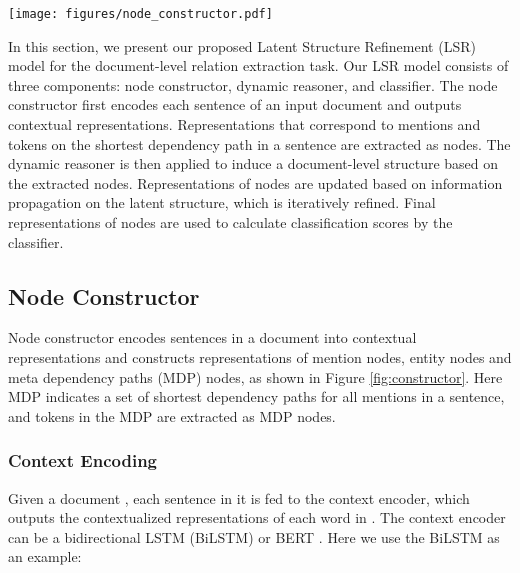 \documentclass[11pt,a4paper]{article}
\begin{document}
\begin{figure*}\centering
\texttt{[image: figures/node\_constructor.pdf]}
\vspace{-3mm}
\caption{Overview of the Node Constructor: A context encoder is applied to get the contextualized representations of sentences. The representations of mentions and words in the meta dependency paths are extracted as mention nodes and MDP nodes. An average pooling is used to construct the entity node from the mention nodes. For example, the entity node \textit{Lutsenko} is constructed by averaging representations of its mentions \textit{Lutsenko} and \textit{He}. All figures best viewed in color.} 
\vspace{-3mm}
\label{fig:constructor}
\end{figure*}

In this section, we present our proposed Latent Structure Refinement (LSR) model for the document-level relation extraction task. Our LSR model consists of three components: node constructor, dynamic reasoner, and classifier. The node constructor first encodes each sentence of an input document and outputs contextual representations. Representations that correspond to mentions and tokens on the shortest dependency path in a sentence are extracted as nodes. The dynamic reasoner is then applied to induce a document-level structure based on the extracted nodes. Representations of nodes are updated based on information propagation on the latent structure, which is iteratively refined. Final representations of nodes are used to calculate classification scores by the classifier.

\subsection{Node Constructor}
\label{ssec:3.1}
Node constructor encodes sentences in a document into contextual representations and constructs representations of mention nodes, entity nodes and meta dependency paths (MDP) nodes, as shown in Figure \ref{fig:constructor}. Here MDP indicates a set of shortest dependency paths for all mentions in a sentence, and tokens in the MDP are extracted as MDP nodes.

\vspace{-1mm}

\subsubsection{Context Encoding}
\label{ssec:3.1.1}
Given a document , each sentence  in it is fed to the context encoder, which outputs the contextualized representations of each word in . The context encoder can be a bidirectional LSTM (BiLSTM) \citep{Schuster1997BidirectionalRN} or BERT \citep{Devlin2019BERTPO}. Here we use the BiLSTM as an example: 
\end{document}
